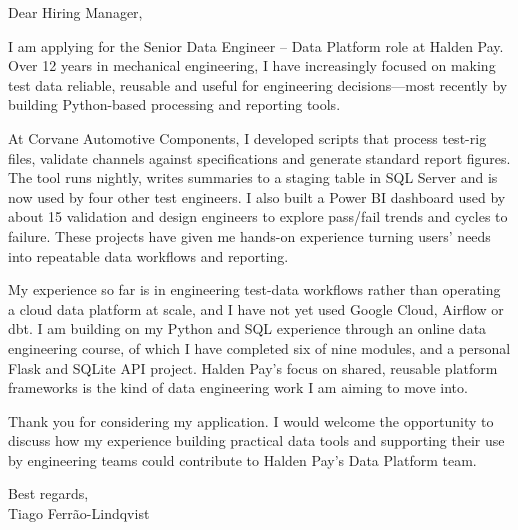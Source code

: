 \documentclass[11pt,a4paper]{article}
\begin{document}

\vspace{1.5em}

\noindent Dear Hiring Manager,

\vspace{1em}

\noindent I am applying for the Senior Data Engineer -- Data Platform role at Halden Pay. Over 12 years in mechanical engineering, I have increasingly focused on making test data reliable, reusable and useful for engineering decisions---most recently by building Python-based processing and reporting tools.

\vspace{0.8em}

\noindent At Corvane Automotive Components, I developed scripts that process test-rig files, validate channels against specifications and generate standard report figures. The tool runs nightly, writes summaries to a staging table in SQL Server and is now used by four other test engineers. I also built a Power BI dashboard used by about 15 validation and design engineers to explore pass/fail trends and cycles to failure. These projects have given me hands-on experience turning users' needs into repeatable data workflows and reporting.

\vspace{0.8em}

\noindent My experience so far is in engineering test-data workflows rather than operating a cloud data platform at scale, and I have not yet used Google Cloud, Airflow or dbt. I am building on my Python and SQL experience through an online data engineering course, of which I have completed six of nine modules, and a personal Flask and SQLite API project. Halden Pay's focus on shared, reusable platform frameworks is the kind of data engineering work I am aiming to move into.

\vspace{0.8em}

\noindent Thank you for considering my application. I would welcome the opportunity to discuss how my experience building practical data tools and supporting their use by engineering teams could contribute to Halden Pay's Data Platform team.

\vspace{1.2em}

\noindent Best regards,\\
Tiago Ferrão-Lindqvist
\end{document}
